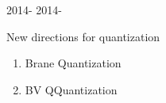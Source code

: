 \documentclass{beamer}
\begin{document}
\begin{frame}{2014-}
2014-
\end{frame}

\begin{frame}{New directions for quantization}
\begin{enumerate}
\item Brane Quantization
\item BV QQuantization
\end{enumerate}
\end{frame}
\end{document}
